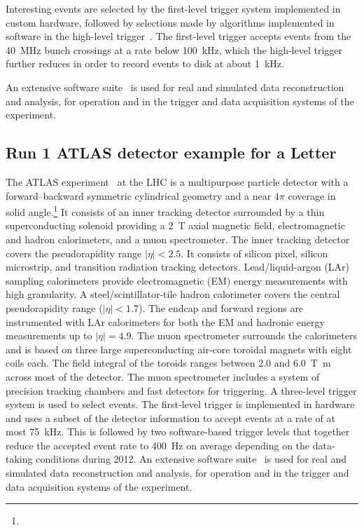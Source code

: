 Interesting events are selected by the first-level trigger system implemented in custom hardware,
followed by selections made by algorithms implemented in software in the high-level trigger~\cite{TRIG-2016-01}. 
The first-level trigger accepts events from the \SI{40}{\MHz} bunch crossings at a rate below \SI{100}{\kHz},
which the high-level trigger further reduces in order to record events to disk at about \SI{1}{\kHz}.

An extensive software suite~\cite{ATL-SOFT-PUB-2021-001} is used for real and simulated data reconstruction
and analysis, for operation and in the trigger and data acquisition systems of the experiment.

\subsection{Run 1 ATLAS detector example for a Letter}
\label{sec:atlas1a}

The ATLAS experiment~\cite{PERF-2007-01} at the LHC is a multipurpose particle detector
with a forward--backward symmetric cylindrical geometry and a near \(4\pi\) coverage in 
solid angle.\footnote{\AtlasCoordFootnote}
It consists of an inner tracking detector surrounded by a thin superconducting solenoid
providing a \SI{2}{\tesla} axial magnetic field, electromagnetic and hadron calorimeters, and a muon spectrometer.
The inner tracking detector covers the pseudorapidity range \(|\eta| < 2.5\).
It consists of silicon pixel, silicon microstrip, and transition radiation tracking detectors.
Lead/liquid-argon (LAr) sampling calorimeters provide electromagnetic (EM) energy measurements
with high granularity.
A steel/scintillator-tile hadron calorimeter covers the central pseudorapidity range (\(|\eta| < 1.7\)).
The endcap and forward regions are instrumented with LAr calorimeters
for both the EM and hadronic energy measurements up to \(|\eta| = 4.9\).
The muon spectrometer surrounds the calorimeters and is based on
three large superconducting air-core toroidal magnets with eight coils each.
The field integral of the toroids ranges between \num{2.0} and \SI{6.0}{\tesla\metre}
across most of the detector. 
The muon spectrometer includes a system of precision tracking chambers and fast detectors for triggering.
A three-level trigger system is used to select events.
The first-level trigger is implemented in hardware and uses a subset of the detector information
to accept events at a rate of at most \SI{75}{\kilo\hertz}.
This is followed by two software-based trigger levels that
together reduce the accepted event rate to \SI{400}{\hertz} on average
depending on the data-taking conditions during 2012.
An extensive software suite~\cite{ATL-SOFT-PUB-2021-001} is used for real and simulated data reconstruction
and analysis, for operation and in the trigger and data acquisition systems of the experiment.


